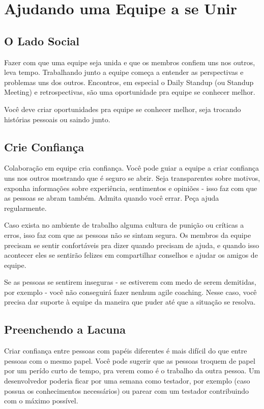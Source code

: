 \documentclass[a4paper, 10pt, font=plain]{abnt}
\begin{document}
\section{Ajudando uma Equipe a se Unir}

\subsection{O Lado Social}
Fazer com que uma equipe seja unida e que os membros confiem uns nos outros, leva tempo. Trabalhando junto a equipe começa a entender as perspectivas e problemas uns dos outros. Encontros, em especial o Daily Standup (ou Standup Meeting) e retrospectivas, são uma oportunidade pra equipe se conhecer melhor.

Você deve criar oportunidades pra equipe se conhecer melhor, seja trocando histórias pessoais ou saindo junto.

\subsection{Crie Confiança}
Colaboração em equipe cria confiança. Você pode guiar a equipe a criar confiança uns nos outros mostrando que é seguro se abrir. Seja transparentes sobre motivos, exponha informações sobre experiência, sentimentos e opiniões - isso faz com que as pessoas se abram também. Admita quando você errar. Peça ajuda regularmente.

Caso exista no ambiente de trabalho alguma cultura de punição ou críticas a erros, isso faz com que as pessoas não se sintam segura. Os membros da equipe precisam se sentir confortáveis pra dizer quando precisam de ajuda, e quando isso acontecer eles se sentirão felizes em compartilhar conselhos e ajudar os amigos de equipe.

Se as pessoas se sentirem inseguras - se estiverem com medo de serem demitidas, por exemplo - você não conseguirá fazer nenhum agile coaching. Nesse caso, você precisa dar suporte à equipe da maneira que puder até que a situação se resolva.


\subsection{Preenchendo a Lacuna}
Criar confiança entre pessoas com papéis diferentes é mais difícil do que entre pessoas com o mesmo papel. Você pode sugerir que as pessoas troquem de papel por um perído curto de tempo, pra verem como é o trabalho da outra pessoa. Um desenvolvedor poderia ficar por uma semana como testador, por exemplo (caso possua os conhecimentos necessários) ou parear com um testador contribuindo com o máximo possível.
\end{document}
